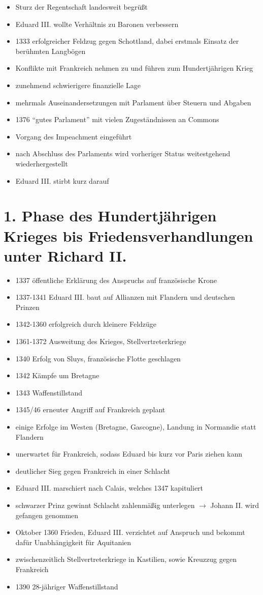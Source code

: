 \documentclass[10pt,a4paper,oneside,ngerman,numbers=noenddot]{scrartcl}
\newenvironment{myitemize}{\begin{itemize}\itemsep -2pt}{\end{itemize}} %
\begin{document}
\begin{myitemize}
	\item Sturz der Regentschaft landesweit begrüßt
	\item Eduard III. wollte Verhältnis zu Baronen verbessern
	\item 1333 erfolgreicher Feldzug gegen Schottland, dabei erstmals Einsatz der berühmten Langbögen
	\item Konflikte mit Frankreich nehmen zu und führen zum Hundertjährigen Krieg
	\item zunehmend schwierigere finanzielle Lage
	\item mehrmals Auseinandersetzungen mit Parlament über Steuern und Abgaben
	\item 1376 "`gutes Parlament"' mit vielen Zugeständnissen an Commons
	\item Vorgang des Impeachment eingeführt
	\item nach Abschluss des Parlaments wird vorheriger Status weitestgehend wiederhergestellt
	\item Eduard III. stirbt kurz darauf
\end{myitemize}

\section*{1. Phase des Hundertjährigen Krieges bis Friedensverhandlungen unter Richard II.}
\begin{myitemize}
	\item 1337 öffentliche Erklärung des Anspruchs auf französische Krone
	\item 1337-1341 Eduard III. baut auf Allianzen mit Flandern und deutschen Prinzen
	\item 1342-1360 erfolgreich durch kleinere Feldzüge
	\item 1361-1372 Ausweitung des Krieges, Stellvertreterkriege
	\item 1340 Erfolg von Sluys, französische Flotte geschlagen
	\item 1342 Kämpfe um Bretagne
	\item 1343 Waffenstillstand
	\item 1345/46 erneuter Angriff auf Frankreich geplant 
	\item einige Erfolge im Westen (Bretagne, Gascogne), Landung in Normandie statt Flandern
	\item unerwartet für Frankreich, sodass Eduard bis kurz vor Paris ziehen kann
	\item deutlicher Sieg gegen Frankreich in einer Schlacht
	\item Eduard III. marschiert nach Calais, welches 1347 kapituliert
	\item schwarzer Prinz gewinnt Schlacht zahlenmäßig unterlegen \(\rightarrow\) Johann II. wird gefangen genommen
	\item Oktober 1360 Frieden, Eduard III. verzichtet auf Anspruch und bekommt dafür Unabhängigkeit für Aquitanien
	\item zwischenzeitlich Stellvertreterkriege in Kastilien, sowie Kreuzzug gegen Frankreich
	\item 1390 28-jähriger Waffenstillstand
\end{myitemize}
\end{document}
